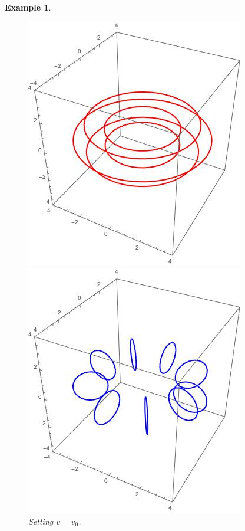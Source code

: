 \documentclass[12pt]{article}
\newtheorem{example}{Example}
\begin{document}
\begin{example}
\begin{figure}[h]
  \includegraphics[width=\linewidth]{red.jpeg}
  \caption{Setting $v=v_0$.}\label{fig3}
\endminipage\hfill
{}
  \includegraphics[width=\linewidth]{blue.jpeg}

\end{figure}
\end{example}
\end{document}

